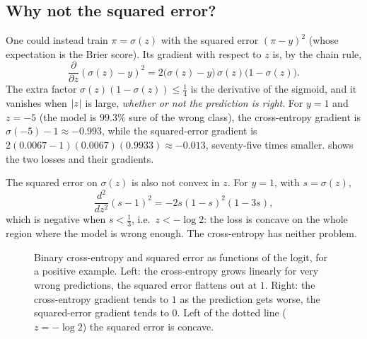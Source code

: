 \begin{notechapter}
\section{Why not the squared error?}\label{sigmoid-softmax:sec:mse}

One could instead train $\pi = \sigma(z)$ with the squared error $(\pi - y)^2$ (whose expectation
is the Brier score). Its gradient with respect to $z$ is, by the chain rule,
\[
  \frac{\partial}{\partial z}(\sigma(z) - y)^2 = 2\bigl(\sigma(z) - y\bigr)\,\sigma(z)\bigl(1 - \sigma(z)\bigr).
\]
The extra factor $\sigma(z)(1 - \sigma(z))\leq\frac14$ is the derivative of the sigmoid, and it vanishes
when $\left|z\right|$ is large, \emph{whether or not the prediction is right}. For $y = 1$ and $z = -5$
(the model is $99.3\%$ sure of the wrong class), the cross-entropy gradient is
$\sigma(-5) - 1\approx-0.993$, while the squared-error gradient is
$2(0.0067 - 1)(0.0067)(0.9933)\approx-0.013$, seventy-five times smaller.
 shows the two losses and their gradients.

The squared error on $\sigma(z)$ is also not convex in $z$. For $y = 1$, with $s = \sigma(z)$,
\[
  \frac{d^2}{dz^2}(s - 1)^2 = -2s(1 - s)^2(1 - 3s),
\]
which is negative when $s<\frac13$, i.e.\ $z<-\log2$: the loss is concave on the
whole region where the model is wrong enough. The cross-entropy has neither
problem.

\begin{figure}[ht]
\centering
{}
\caption{Binary cross-entropy and squared error as functions of the logit, for a
positive example. Left: the cross-entropy grows linearly for very wrong
predictions, the squared error flattens out at $1$. Right: the cross-entropy
gradient tends to $1$ as the prediction gets worse, the squared-error gradient
tends to $0$. Left of the dotted line ($z = -\log2$) the squared error is concave.}
\label{sigmoid-softmax:fig:mse}
\end{figure}


\end{notechapter}

